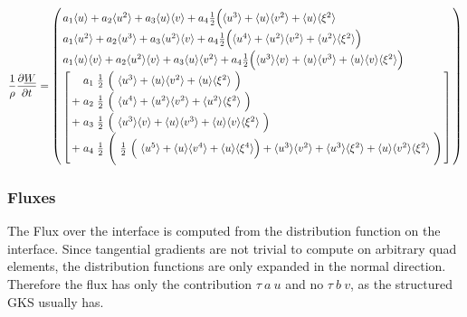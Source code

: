 \documentclass[
	pdftex,             %
	12pt,				%
	a4paper,		   	%
	english,				%
	oneside,			%
]{article}
\newcommand{\mom}[1]{\langle #1 \rangle}
\newcommand{\uu}[1]{\underline{#1}}
\begin{document}
\begin{equation}
\arraycolsep=1.4pt\def\arraystretch{1.5}
\dfrac{1}{\rho}\dfrac{\partial \uu{W}}{\partial t} = 
\left(
\begin{array}{l}
        a_1 \mom{u} + a_2 \mom{u^2} + a_3 \mom{u}\mom{v}
    +   a_4 \frac{1}{2} \Big( \mom{u^3} + \mom{u}\mom{v^2} + \mom{u}\mom{\xi^2}
    \\
        a_1 \mom{u^2} + a_2 \mom{u^3} + a_3 \mom{u^2}\mom{v}
    +   a_4 \frac{1}{2} \Big( \mom{u^4} + \mom{u^2}\mom{v^2} + \mom{u^2}\mom{\xi^2} \Big)
    \\
        a_1 \mom{u}\mom{v} + a_2 \mom{u^2}\mom{v} + a_3 \mom{u}\mom{v^2}
    +   a_4 \frac{1}{2} \Big( \mom{u^3}\mom{v} + \mom{u}\mom{v^3} + \mom{u}\mom{v}\mom{\xi^2} \Big)
    \\
    \left[
        \begin{array}{lcl}
             &a_1& \frac{1}{2}~ \Big(~ \mom{u^3} + \mom{u}\mom{v^2} + \mom{u}\mom{\xi^2} ~\Big) \\
            +&a_2& \frac{1}{2}~ \Big(~ \mom{u^4} + \mom{u^2}\mom{v^2} + \mom{u^2}\mom{\xi^2} ~\Big) \\
            +&a_3& \frac{1}{2}~ \Big(~ \mom{u^3}\mom{v} + \mom{u}\mom{v^3} + \mom{u}\mom{v}\mom{\xi^2} ~\Big) \\
            +&a_4& \frac{1}{2}~ \Bigg(~ \frac{1}{2}~
					\Big(~ \mom{u^5} + \mom{u}\mom{v^4} + \mom{u}\mom{\xi^4} \Big)
						 + \mom{u^3}\mom{v^2} + \mom{u^3}\mom{\xi^2} + \mom{u}\mom{v^2}\mom{\xi^2}
					~\Bigg)
        \end{array}
    \right]
\end{array}
\right)
\end{equation}

\subsubsection{Fluxes}

The Flux over the interface is computed from the distribution function on the interface. Since tangential gradients are not trivial to compute on arbitrary quad elements, the distribution functions are only expanded in the normal direction. Therefore the flux has only the contribution $\tau~a~u$ and no $\tau~b~v$, as the structured GKS usually has.
\end{document}

